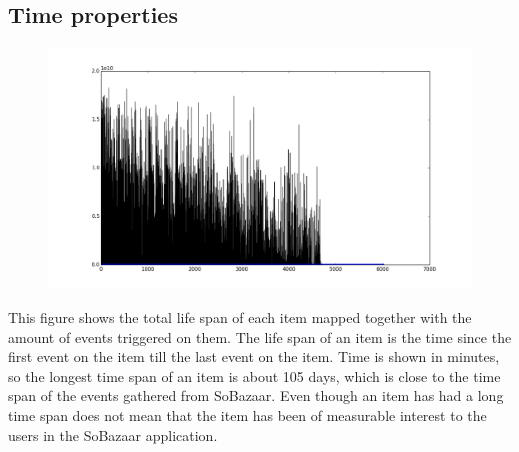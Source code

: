 \subsection{Time properties}

    \begin{figure}[H]
        \includegraphics[width=5in]{image/itemTimeSpansortedoneventcount.png}
        \centering
        \caption[Life time of items mapped with event count]{}
    \label{figure:itemTimeSpanEventCount}
    \end{figure}
        This figure shows the total life span of each item mapped together with the amount of events triggered on them.
        The life span of an item is the time since the first event on the item till the last event on the item.
        Time is shown in minutes, so the longest time span of an item is about 105 days, which is close to the time span of the events gathered from SoBazaar.
        Even though an item has had a long time span does not mean that the item has been of measurable interest to the users in the SoBazaar application.

